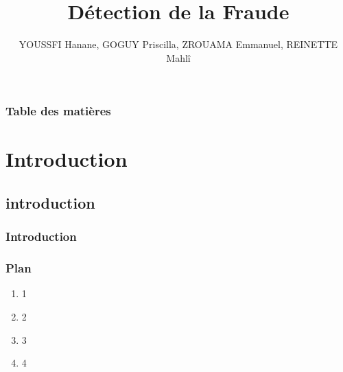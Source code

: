 \documentclass[10pt]{beamer}
\title{Détection de la Fraude}
\author{YOUSSFI Hanane, GOGUY Priscilla, ZROUAMA Emmanuel, REINETTE Mahlî}
\date{}
\begin{document}
\begin{frame}
\maketitle
\end{frame}



\begin{frame}
\frametitle{Table des matières}
\tableofcontents[]
\end{frame}












\section{Introduction}
\subsection{introduction}
\begin{frame}
\frametitle{Introduction}

\footnotemark[1]
\footnotetext[1]{}
\end{frame}


\begin{frame}
\frametitle{Plan}
\begin{enumerate}
	\item 1
	\item 2
	\item 3
	\item 4
\end{enumerate}
\end{frame}
\end{document}
